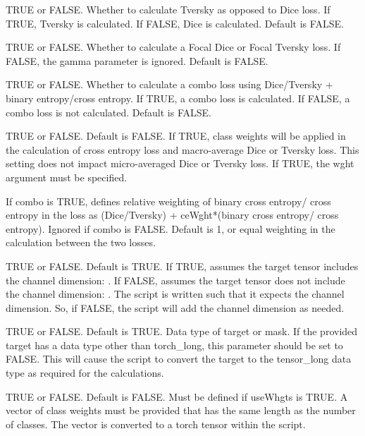\documentclass[a4paper]{book}
\begin{document}
\begin{Arguments}
\begin{ldescription}
\item[\code{tversky}] TRUE or FALSE. Whether to calculate Tversky as opposed to Dice
loss. If TRUE, Tversky is calculated. If FALSE, Dice is calculated. Default is FALSE.

\item[\code{focal}] TRUE or FALSE. Whether to calculate a Focal Dice or Focal Tversky loss.
If FALSE, the gamma parameter is ignored. Default is FALSE.

\item[\code{combo}] TRUE or FALSE. Whether to calculate a combo loss using Dice/Tversky +
binary entropy/cross entropy. If TRUE, a combo loss is calculated. If FALSE, a
combo loss is not calculated. Default is FALSE.

\item[\code{useWghts}] TRUE or FALSE. Default is FALSE. If TRUE, class weights will be applied
in the calculation of cross entropy loss and macro-average Dice or Tversky loss. This setting
does not impact micro-averaged Dice or Tversky loss. If TRUE, the wght argument must be specified.

\item[\code{ceWght}] If combo is TRUE, defines relative weighting of binary cross entropy/
cross entropy in the loss as (Dice/Tversky) + ceWght*(binary cross entropy/
cross entropy). Ignored if combo is FALSE. Default is 1, or equal weighting in
the calculation between the two losses.

\item[\code{chnDim}] TRUE or FALSE. Default is TRUE. If TRUE, assumes the target tensor includes the
channel dimension: . If FALSE, assumes the target tensor does not include the
channel dimension: . The script is written such that it expects the channel dimension.
So, if FALSE, the script will add the channel dimension as needed.

\item[\code{mskLong}] TRUE or FALSE. Default is TRUE. Data type of target or mask. If the provided target
has a data type other than torch\_long, this parameter should be set to FALSE. This will cause the
script to convert the target to the tensor\_long data type as required for the calculations.

\item[\code{wght}] TRUE or FALSE. Default is FALSE. Must be defined if useWhgts is TRUE. A vector of class
weights must be provided that has the same length as the number of classes. The vector is converted to
a torch tensor within the script.
\end{ldescription}
\end{Arguments}
\end{document}
